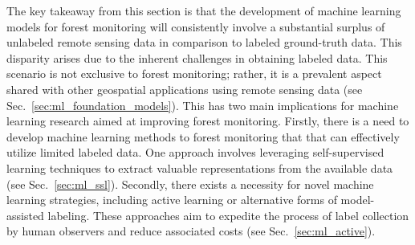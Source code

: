 \documentclass{CUP-JNL-DTM}%
\theoremstyle{definition}
\numberwithin{equation}{section}
\begin{document}
The key takeaway from this section is that the development of machine learning models for forest monitoring will consistently involve a substantial surplus of unlabeled remote sensing data in comparison to labeled ground-truth data. This disparity arises due to the inherent challenges in obtaining labeled data.
This scenario is not exclusive to forest monitoring; rather, it is a prevalent aspect shared with other geospatial applications using remote sensing data \cite{rahaman_general_2022, mai_opportunities_2023} (see Sec.~\ref{sec:ml_foundation_models}).
This has two main implications for machine learning research aimed at improving forest monitoring. 
Firstly, there is a need to develop machine learning methods to forest monitoring that that can effectively utilize limited labeled data. One approach involves leveraging self-supervised learning techniques to extract valuable representations from the available data (see Sec.~\ref{sec:ml_ssl}).
Secondly, there exists a necessity for novel machine learning strategies, including active learning or alternative forms of model-assisted labeling. These approaches aim to expedite the process of label collection by human observers and reduce associated costs (see Sec.~\ref{sec:ml_active}).


    
\end{document}
